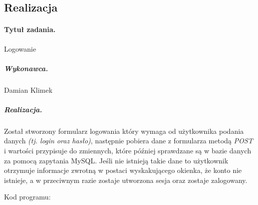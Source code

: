 \documentclass[a4paper]{article}
\begin{document}
	\subsection{Realizacja}
	
	\paragraph{Tytuł zadania.} Logowanie 
	\subparagraph{Wykonawca.} Damian Klimek 
	\subparagraph{Realizacja.} Został stworzony formularz logowania który wymaga od użytkownika podania danych \emph{(tj. login oraz hasło)}, następnie pobiera dane z formularza metodą \emph{POST} i wartości przypisuje do zmiennych, które później sprawdzane są w bazie danych za pomocą zapytania MySQL. Jeśli nie istnieją takie dane to użytkownik otrzymuje informacje zwrotną w postaci wyskakującego okienka, że konto nie istnieje, a w przeciwnym razie zostaje utworzona sesja oraz zostaje zalogowany.
	
	
	
	Kod programu:
	
\end{document}
